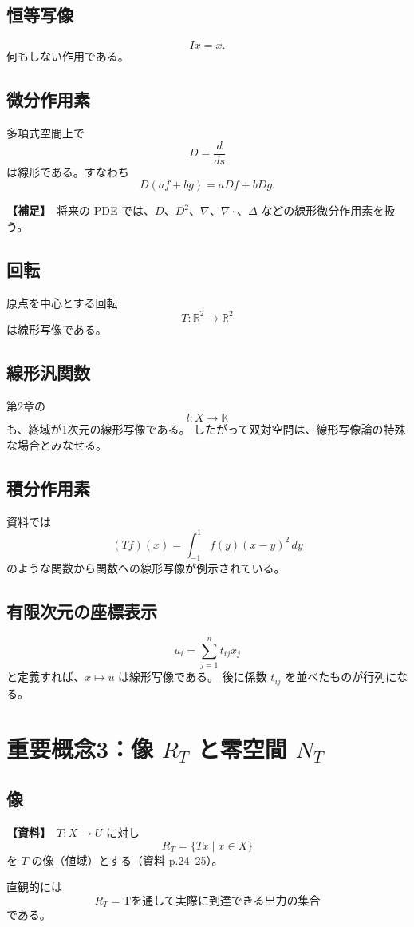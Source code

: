 \documentclass[a4paper,11pt]{ltjsarticle}
\newcommand{\R}{\mathbb{R}}
\newcommand{\K}{\mathbb{K}}
\newcommand{\sourceitem}{\textbf{【資料】}}
\newcommand{\suppitem}{\textbf{【補足】}}
\begin{document}
\subsection{恒等写像}
\[
Ix=x.
\]
何もしない作用である。

\subsection{微分作用素}
多項式空間上で
\[
D=\frac{d}{ds}
\]
は線形である。すなわち
\[
D(af+bg)=aDf+bDg.
\]

\suppitem\ 将来の PDE では、$D$、$D^2$、$\nabla$、$\nabla\cdot$、$\Delta$ などの線形微分作用素を扱う。

\subsection{回転}
原点を中心とする回転
\[
T:\R^2\to\R^2
\]
は線形写像である。

\subsection{線形汎関数}
第2章の
\[
l:X\to\K
\]
も、終域が1次元の線形写像である。
したがって双対空間は、線形写像論の特殊な場合とみなせる。

\subsection{積分作用素}
資料では
\[
(Tf)(x)=\int_{-1}^{1}f(y)(x-y)^2\,dy
\]
のような関数から関数への線形写像が例示されている。

\subsection{有限次元の座標表示}
\[
u_i=\sum_{j=1}^{n}t_{ij}x_j
\]
と定義すれば、$x\mapsto u$ は線形写像である。
後に係数 $t_{ij}$ を並べたものが行列になる。

\section{重要概念3：像 $R_T$ と零空間 $N_T$}

\subsection{像}
\sourceitem\ $T:X\to U$ に対し
\[
\boxed{R_T=\{Tx\mid x\in X\}}
\]
を $T$ の像（値域）とする（資料 p.24--25）。

直観的には
\[
\boxed{R_T=\text{Tを通して実際に到達できる出力の集合}}
\]
である。
\end{document}
